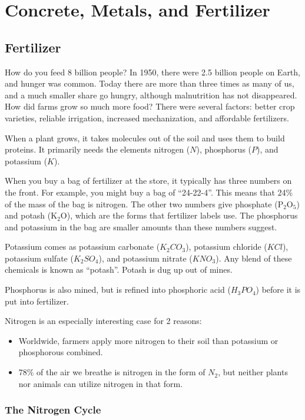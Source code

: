 \chapter{Concrete, Metals, and Fertilizer}


\section{Fertilizer}
How do you feed 8 billion people? In 1950, there were 2.5 billion people on Earth, and hunger was common. Today there are more than three times as many of us, and a much smaller share go hungry, although malnutrition has not disappeared. How did farms grow so much more food? There were several factors: better crop varieties,
reliable irrigation, increased mechanization, and affordable fertilizers.

When a plant grows, it takes molecules out of the soil and uses them
to build proteins. It primarily needs the elements nitrogen ($N$),
phosphorus ($P$), and potassium ($K$).  

When you buy a bag of fertilizer at the store, it typically has
three numbers on the front. For example, you might buy a bag of
``24-22-4''.  This means that 24\% of the mass of the bag is nitrogen. The other two numbers give phosphate (P$_2$O$_5$) and potash (K$_2$O), which are the forms that fertilizer labels use. The phosphorus and potassium in the bag are smaller amounts than these numbers suggest.

Potassium comes as potassium carbonate ($K_2CO_3$), potassium chloride
($KCl$), potassium sulfate ($K_2 SO_4$), and potassium nitrate
($KNO_3$). Any blend of these chemicals is known as ``potash''. Potash
is dug up out of mines. 

Phosphorus is also mined, but is refined into phosphoric acid
($H_3PO_4$) before it is put into fertilizer.

Nitrogen is an especially interesting case for 2 reasons:
\begin{itemize}
\item Worldwide, farmers apply more nitrogen to their soil than potassium or phosphorous combined.
\item 78\% of the air we breathe is nitrogen in the form of $N_2$, but
  neither plants nor animals can utilize nitrogen in that form.
\end{itemize}

\subsection{The Nitrogen Cycle}

